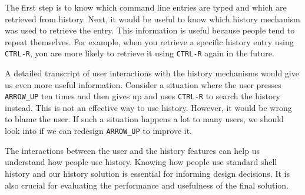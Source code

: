 The first step is to know which command line entries are typed and which are retrieved from history. Next, it would be useful to know which history mechanism was used to retrieve the entry. This information is useful because people tend to repeat themselves. 
For example, when you retrieve a specific history entry using \verb|CTRL-R|, you are more likely to retrieve it using \verb|CTRL-R| again in the future. %

A detailed transcript of user interactions with the history mechanisms would give us even more useful information. Consider a situation where the user presses \verb|ARROW_UP| ten times and then gives up and uses \verb|CTRL-R| to search the history instead. This is not an effective way to use history. However, it would be wrong to blame the user. If such a situation happens a lot to many users, we should look into if we can redesign \verb|ARROW_UP| to improve it.

The interactions between the user and the history features can help us understand how people use history. Knowing how people use standard shell history and our history solution is essential for informing design decisions. It is also crucial for evaluating the performance and usefulness of the final solution. %
